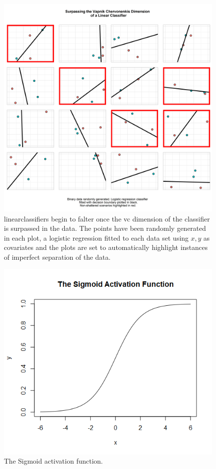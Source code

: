 \begin{figure}[H]
    \centering
    \includegraphics[width=120mm]{figs/vc_4.png}
    \caption[Surpassing the \gls{vc} dimension of a linear classifier - the data is not always shattered.]{\Gls{linearclassifier}s begin to falter once the \gls{vc} dimension of the classifier is surpassed in the data. The points have been randomly generated in each plot, a logistic regression fitted to each data set using $x, y$ as covariates and the plots are set to automatically highlight instances of imperfect separation of the data.}
    \label{fig:vc_4}
\end{figure}

\begin{figure}
    \includegraphics[scale=0.5]{figs/sigmoid.png}
    \caption{The Sigmoid activation function.}
    \label{fig:sigmoid_function}
\end{figure}

